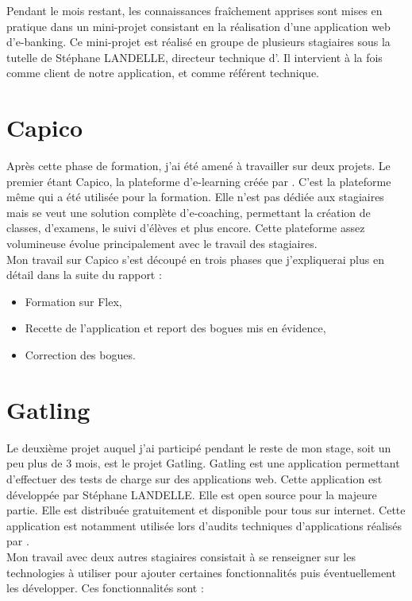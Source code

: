 Pendant le mois restant, les connaissances fraîchement apprises sont mises en pratique dans un mini-projet consistant en la réalisation d'une application web d'e-banking. Ce mini-projet est réalisé en groupe de plusieurs stagiaires sous la tutelle de Stéphane LANDELLE, directeur technique d'\ebi{}. Il intervient à la fois comme client de notre application, et comme référent technique.

\section{Capico}

Après cette phase de formation, j'ai été amené à travailler sur deux projets. Le premier étant Capico, la plateforme d'e-learning créée par \excilys{}. C'est la plateforme même qui a été utilisée pour la formation. Elle n'est pas dédiée aux stagiaires mais se veut une solution complète d'e-coaching, permettant la création de classes, d'examens, le suivi d'élèves et plus encore. Cette plateforme assez volumineuse évolue principalement avec le travail des stagiaires.\\

Mon travail sur Capico s'est découpé en trois phases que j'expliquerai plus en détail dans la suite du rapport :

\begin{itemize}
	\item Formation sur Flex,
	\item Recette de l'application et report des bogues mis en évidence,
	\item Correction des bogues.
\end{itemize}

\section{Gatling}

Le deuxième projet auquel j'ai participé pendant le reste de mon stage, soit un peu plus de 3 mois, est le projet Gatling. Gatling est une application permettant d'effectuer des tests de charge sur des applications web. Cette application est développée par Stéphane LANDELLE. Elle est open source pour la majeure partie. Elle est distribuée gratuitement et disponible pour tous sur internet. Cette application est notamment utilisée lors d'audits techniques d'applications réalisés par \ebi{}.\\

Mon travail avec deux autres stagiaires consistait à se renseigner sur les technologies à utiliser pour ajouter certaines fonctionnalités puis éventuellement les développer. Ces fonctionnalités sont :

